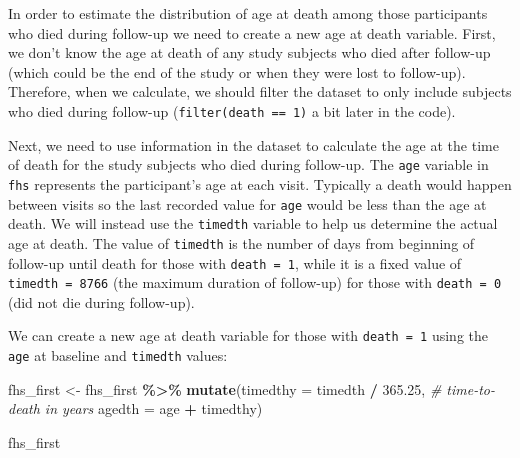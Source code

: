 \documentclass[
]{book}
\newenvironment{Shaded}{\begin{snugshade}}{\end{snugshade}}
\newcommand{\AttributeTok}[1]{\textcolor[rgb]{0.13,0.29,0.53}{#1}}
\newcommand{\CommentTok}[1]{\textcolor[rgb]{0.56,0.35,0.01}{\textit{#1}}}
\newcommand{\FloatTok}[1]{\textcolor[rgb]{0.00,0.00,0.81}{#1}}
\newcommand{\FunctionTok}[1]{\textcolor[rgb]{0.13,0.29,0.53}{\textbf{#1}}}
\newcommand{\NormalTok}[1]{#1}
\newcommand{\OtherTok}[1]{\textcolor[rgb]{0.56,0.35,0.01}{#1}}
\newcommand{\SpecialCharTok}[1]{\textcolor[rgb]{0.81,0.36,0.00}{\textbf{#1}}}
\begin{document}
In order to estimate the distribution of age at death among those participants who died during follow-up we need to create a new age at death variable. First, we don't know the age at death of any study subjects who died after follow-up (which could be the end of the study or when they were lost to follow-up). Therefore, when we calculate, we should filter the dataset to only include subjects who died during follow-up (\texttt{filter(death\ ==\ 1)} a bit later in the code).

Next, we need to use information in the dataset to calculate the age at the time of death for the study subjects who died during follow-up.
The \texttt{age} variable in \texttt{fhs} represents the participant's age at each visit. Typically a death would happen between visits so the last recorded value for \texttt{age} would be less than the age at death. We will instead use the \texttt{timedth} variable to help us determine the actual age at death. The value of \texttt{timedth} is the number of days from beginning of follow-up until death for those with \texttt{death\ =\ 1}, while it is a fixed value of \texttt{timedth\ =\ 8766} (the maximum duration of follow-up) for those with \texttt{death\ =\ 0} (did not die during follow-up).

We can create a new age at death variable for those with \texttt{death\ =\ 1} using the \texttt{age} at baseline and \texttt{timedth} values:

\begin{Shaded}
\begin{Highlighting}[]
\NormalTok{fhs\_first }\OtherTok{\textless{}{-}}\NormalTok{ fhs\_first }\SpecialCharTok{\%\textgreater{}\%} 
  \FunctionTok{mutate}\NormalTok{(}\AttributeTok{timedthy =}\NormalTok{ timedth }\SpecialCharTok{/} \FloatTok{365.25}\NormalTok{, }\CommentTok{\# time{-}to{-}death in years}
         \AttributeTok{agedth =}\NormalTok{ age }\SpecialCharTok{+}\NormalTok{ timedthy) }

\NormalTok{fhs\_first }
\end{Highlighting}
\end{Shaded}
\end{document}
